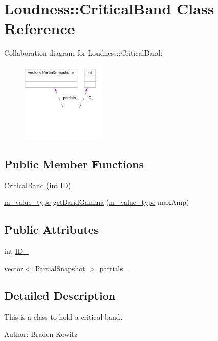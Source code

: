 \hypertarget{classLoudness_1_1CriticalBand}{
\section{Loudness::Critical\-Band Class Reference}
\label{classLoudness_1_1CriticalBand}
}
Collaboration diagram for Loudness::Critical\-Band:\begin{figure}[H]
\begin{center}
\leavevmode
\includegraphics[width=114pt]{classLoudness_1_1CriticalBand__coll__graph}
\end{center}
\end{figure}
\subsection*{Public Member Functions}
\begin{CompactItemize}
\item 
\hyperlink{classLoudness_1_1CriticalBand_a0}{Critical\-Band} (int ID)
\item 
\hyperlink{Types_8h_a3}{m\_\-value\_\-type} \hyperlink{classLoudness_1_1CriticalBand_a1}{get\-Band\-Gamma} (\hyperlink{Types_8h_a3}{m\_\-value\_\-type} max\-Amp)
\end{CompactItemize}
\subsection*{Public Attributes}
\begin{CompactItemize}
\item 
int \hyperlink{classLoudness_1_1CriticalBand_o0}{ID\_\-}
\item 
vector$<$ \hyperlink{classLoudness_1_1PartialSnapshot}{Partial\-Snapshot} $>$ \hyperlink{classLoudness_1_1CriticalBand_o1}{partials\_\-}
\end{CompactItemize}


\subsection{Detailed Description}
This is a class to hold a critical band. \begin{Desc}
\item[Author:]Braden Kowitz \end{Desc}




